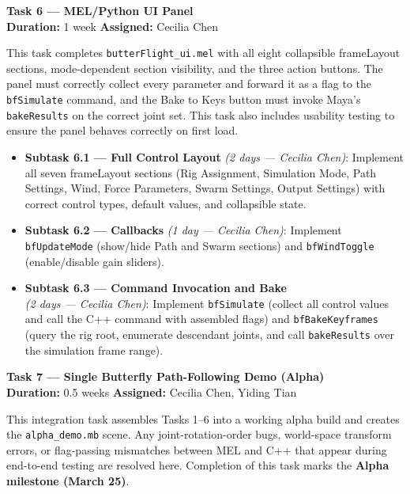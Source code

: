 \documentclass[12pt]{article}
\begin{document}
\bigskip
\noindent\textbf{Task 6 --- MEL/Python UI Panel}\\
\textbf{Duration:} 1 week \quad \textbf{Assigned:} Cecilia Chen

This task completes \texttt{butterFlight\_ui.mel} with all eight collapsible
frameLayout sections, mode-dependent section visibility,
and the three action buttons. The panel must correctly collect every parameter and
forward it as a flag to the \texttt{bfSimulate} command, and the Bake to Keys button
must invoke Maya's \texttt{bakeResults} on the correct joint set. This task also
includes usability testing to ensure the panel behaves correctly on first load.

\begin{itemize}
  \item \textbf{Subtask 6.1 --- Full Control Layout} \textit{(2 days --- Cecilia Chen)}: Implement all seven
    frameLayout sections (Rig Assignment, Simulation Mode, Path
    Settings, Wind, Force Parameters, Swarm Settings, Output Settings) with correct
    control types, default values, and collapsible state.
  \item \textbf{Subtask 6.2 --- Callbacks} \textit{(1 day --- Cecilia Chen)}:
    Implement \texttt{bfUpdateMode}
    (show/hide Path and Swarm sections) and \texttt{bfWindToggle}
    (enable/disable gain sliders).
  \item \textbf{Subtask 6.3 --- Command Invocation and Bake}\\
    \textit{(2 days --- Cecilia Chen)}: Implement
    \texttt{bfSimulate} (collect all control values and call the C++ command with
    assembled flags) and \texttt{bfBakeKeyframes} (query the rig root, enumerate
    descendant joints, and call \texttt{bakeResults} over the simulation frame
    range).
\end{itemize}

\bigskip
\noindent\textbf{Task 7 --- Single Butterfly Path-Following Demo (Alpha)}\\
\textbf{Duration:} 0.5 weeks \quad \textbf{Assigned:} Cecilia Chen, Yiding Tian

This integration task assembles Tasks 1--6 into a working alpha build and creates
the \texttt{alpha\_demo.mb} scene. Any joint-rotation-order bugs, world-space
transform errors, or flag-passing mismatches between MEL and C++ that appear during
end-to-end testing are resolved here. Completion of this task marks the
\textbf{Alpha milestone (March 25)}.
\end{document}
